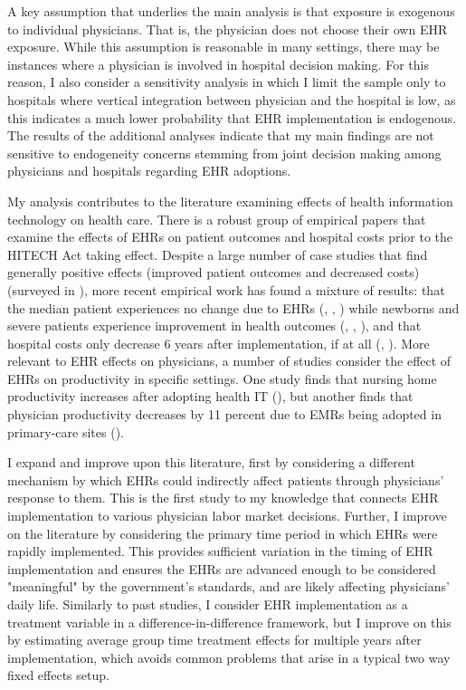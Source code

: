 \documentclass[11pt]{article}
\begin{document}
A key assumption that underlies the main analysis is that exposure is exogenous to individual physicians. That is, the physician does not choose their own EHR exposure. While this assumption is reasonable in many settings, there may be instances where a physician is involved in hospital decision making. For this reason, I also consider a sensitivity analysis in which I limit the sample only to hospitals where vertical integration between physician and the hospital is low, as this indicates a much lower probability that EHR implementation is endogenous. The results of the additional analyses indicate that my main findings are not sensitive to endogeneity concerns stemming from joint decision making among physicians and hospitals regarding EHR adoptions.

My analysis contributes to the literature examining effects of health information technology on health care. There is a robust group of empirical papers that examine the effects of EHRs on patient outcomes and hospital costs prior to the HITECH Act taking effect. Despite a large number of case studies that find generally positive effects (improved patient outcomes and decreased costs) (surveyed in \cite{Buntin2011TheResults}), more recent empirical work has found a mixture of results: that the median patient experiences no change due to EHRs (\cite{Agha2014TheCare}, \cite{McCullough2016HealthCoordination}, \cite{Meyerhoefer}) while newborns and severe patients experience improvement in health outcomes (\cite{Miller2009}, \cite{Freedman2015}, \cite{McCullough2016HealthCoordination}), and that hospital costs only decrease 6 years after implementation, if at all (\cite{Agha2014TheCare}, \cite{dranove2014trillion}). More relevant to EHR effects on physicians, a number of studies consider the effect of EHRs on productivity in specific settings. One study finds that nursing home productivity increases after adopting health IT (\cite{Hitt2016}), but another finds that physician productivity decreases by 11 percent due to EMRs being adopted in primary-care sites (\cite{Meyerhoefer}). 

I expand and improve upon this literature, first by considering a different mechanism by which EHRs could indirectly affect patients through physicians' response to them. This is the first study to my knowledge that connects EHR implementation to various physician labor market decisions. Further, I improve on the literature by considering the primary time period in which EHRs were rapidly implemented. This provides sufficient variation in the timing of EHR implementation and ensures the EHRs are advanced enough to be considered "meaningful" by the government's standards, and are likely affecting physicians' daily life. Similarly to past studies, I consider EHR implementation as a treatment variable in a difference-in-difference framework, but I improve on this by estimating average group time treatment effects for multiple years after implementation, which avoids common problems that arise in a typical two way fixed effects setup.  
\end{document}
